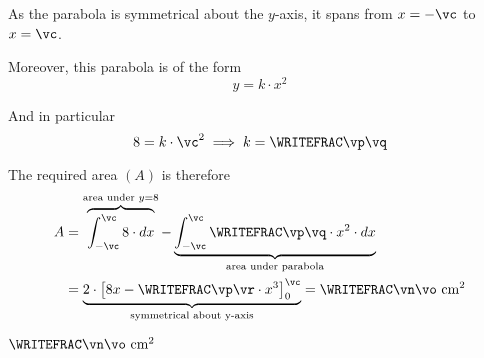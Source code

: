 \begin{solution}[\halfpage]
  As the parabola is symmetrical about the $y$-axis, it spans from $x=-\vc$ to $x=\vc$.

  Moreover, this parabola is of the form 
    \[ y = k\cdot x^2 \]

  And in particular 
    \[ \vb = k\cdot \vc^2 \implies k = \WRITEFRAC\vp\vq \] 

  The required area $(A)$ is therefore 
  \begin{align}
    A &= \overbrace{\int_{-\vc}^{\vc}\vb\cdot dx}^{\text{area under }y=\vb} 
    - \underbrace{\int_{-\vc}^{\vc}\WRITEFRAC\vp\vq\cdot x^2\cdot dx}_{\text{area under parabola}} \\
    &= \underbrace{2\cdot\left[ \vb x - \WRITEFRAC\vp\vr\cdot x^3 \right]_0^{\vc}}_{\text{symmetrical about y-axis}} 
    = \WRITEFRAC\vn\vo\text{ cm}^2
  \end{align}
\end{solution}

\ifprintanswers
  \begin{codex}
    $\WRITEFRAC\vn\vo\text{ cm}^2$ 
  \end{codex}
\fi

